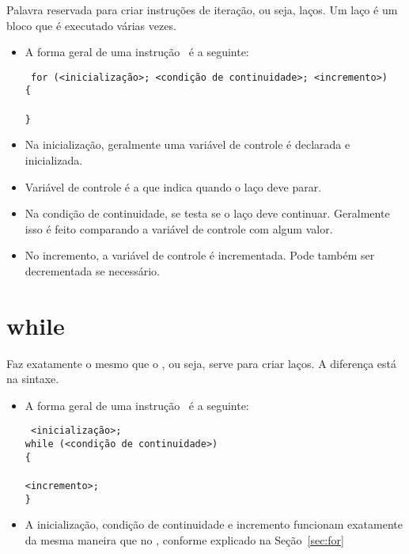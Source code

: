 Palavra reservada para criar instruções de iteração, ou seja, laços. Um laço é um bloco que é executado várias vezes.

\begin{itemize}

\item A forma geral de uma instrução \FOR\ é a seguinte:

{\tt 
for (<inicialização>; <condição de continuidade>; <incremento>) \\
\{                                                            \\
                     \\
\}                                                            \\
}

\item Na inicialização, geralmente uma variável de controle é declarada e inicializada.
\item Variável de controle é a que indica quando o laço deve parar.
\item Na condição de continuidade, se testa se o laço deve continuar. Geralmente isso é feito comparando a variável de controle com algum valor.
\item No incremento, a variável de controle é incrementada. Pode também ser decrementada se necessário.

\end{itemize}


\section{while}
\label{sec:while}

Faz exatamente o mesmo que o \FOR, ou seja, serve para criar laços. A diferença está na sintaxe.

\begin{itemize}

\item A forma geral de uma instrução \WHILE\ é a seguinte:

{\tt 
<inicialização>;                                              \\ 
while (<condição de continuidade>)                            \\
\{                                                            \\
                     \\
\TAB <incremento>;                                            \\
\}                                                            \\
}

\item A inicialização, condição de continuidade e incremento funcionam exatamente da mesma maneira que no \FOR, conforme explicado na Seção~\ref{sec:for}

\end{itemize}


